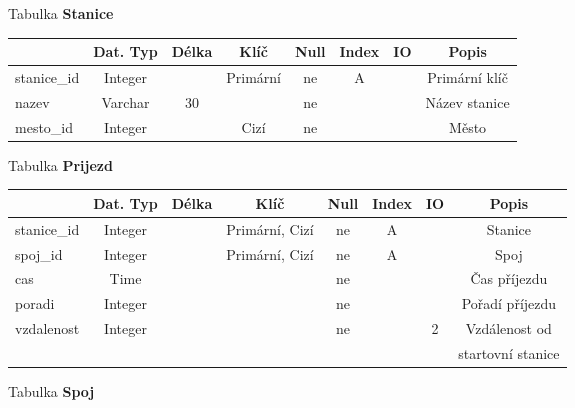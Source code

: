 \documentclass[11pt]{article}
\begin{document}
\noindent
Tabulka \textbf{Stanice}

\begin{table}[H]
    \begin{tabular}{|l|c|c|c|c|c|c|c|} \hline
                & Dat. Typ  & Délka & Klíč      & Null  & Index & IO    & Popis \\ \hline
    stanice\_id	& Integer	&       & Primární	& ne	& A		&       & Primární klíč \\ \hline
    nazev	    & Varchar	& 30	&           & ne	&		&       & Název stanice \\ \hline
    mesto\_id	& Integer	&       & Cizí	    & ne	&		&       & Město \\ \hline
    \end{tabular}
\end{table}

\noindent
Tabulka \textbf{Prijezd}

\begin{table}[H]
    \begin{tabular}{|l|c|c|c|c|c|c|c|} \hline
                & Dat. Typ  & Délka & Klíč              & Null  & Index & IO    & Popis \\ \hline
    stanice\_id	& Integer	&	    & Primární, Cizí	& ne	& A     &		& Stanice \\ \hline
    spoj\_id	& Integer	&	    & Primární, Cizí	& ne	& A	    &	    & Spoj \\ \hline
    cas	        & Time		&	    &                   & ne	&		&       & Čas příjezdu \\ \hline
    poradi	    & Integer	&		&                   & ne	&		&       & Pořadí příjezdu \\ \hline
    vzdalenost	& Integer	&		&                   & ne	&	    & 2     & Vzdálenost od\\ &&&&&&& startovní stanice \\ \hline
    \end{tabular}
\end{table}

\newpage

\noindent
Tabulka \textbf{Spoj}
\end{document}
